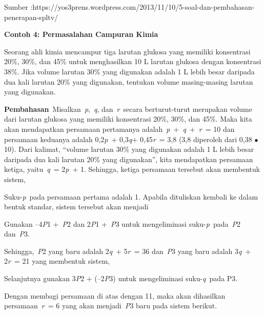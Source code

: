 \documentclass[11pt,fleqn]{book} %
\begin{document}
\noindent Sumber :https://yos3prens.wordpress.com/2013/11/10/5-soal-dan-pembahasan-penerapan-spltv/

\noindent 

\noindent \textbf{Contoh 4: Permasalahan Campuran Kimia}

\noindent Seorang ahli kimia mencampur tiga larutan glukosa yang memiliki konsentrasi 20\%, 30\%, dan 45\% untuk menghasilkan 10 L larutan glukosa dengan konsentrasi 38\%. Jika volume larutan 30\% yang digunakan adalah 1 L lebih besar daripada dua kali larutan 20\% yang digunakan, tentukan volume masing-masing larutan yang digunakan.

\noindent 

\noindent \textbf{Pembahasan}~Misalkan~\textit{p},~\textit{q}, dan~\textit{r}~secara berturut-turut merupakan volume dari larutan glukosa yang memiliki konsentrasi 20\%, 30\%, dan 45\%. Maka kita akan mendapatkan persamaan pertamanya adalah~\textit{p}~+~\textit{q}~+~\textit{r}~= 10 dan persamaan keduanya adalah 0,2\textit{p}~+ 0,3\textit{q}+ 0,45\textit{r}~= 3,8 (3,8 diperoleh dari 0,38 $\mathrm{\bullet}$ 10). Dari kalimat, ``volume larutan 30\% yang digunakan adalah 1 L lebih besar daripada dua kali larutan 20\% yang digunakan'', kita mendapatkan persamaan ketiga, yaitu~\textit{q}~= 2\textit{p}~+ 1. Sehingga, ketiga persamaan tersebut akan membentuk sistem,

\noindent 

\noindent Suku-\textit{p}~pada persamaan pertama adalah 1. Apabila dituliskan kembali ke dalam bentuk standar, sistem tersebut akan menjadi

\noindent 

\noindent Gunakan --4\textit{P}1 +~\textit{P}2 dan 2\textit{P}1 +~\textit{P}3 untuk mengeliminasi suku-\textit{p}~pada~\textit{P}2 dan~\textit{P}3.

\noindent

\noindent 

\noindent Sehingga,~\textit{P}2 yang baru adalah 2\textit{q}~+ 5\textit{r}~= 36 dan~\textit{P}3 yang baru adalah 3\textit{q}~+ 2\textit{r}~= 21 yang membentuk sistem,

\noindent 

\noindent Selanjutnya gunakan 3\textit{P}2 + (--2\textit{P}3) untuk mengeliminasi suku-\textit{q}~pada P3.

\noindent 

\noindent 

\noindent Dengan membagi persamaan di atas dengan 11, maka akan dihasilkan persamaan~\textit{r}~= 6 yang akan menjadi~\textit{P}3 baru pada sistem berikut.
\end{document}
